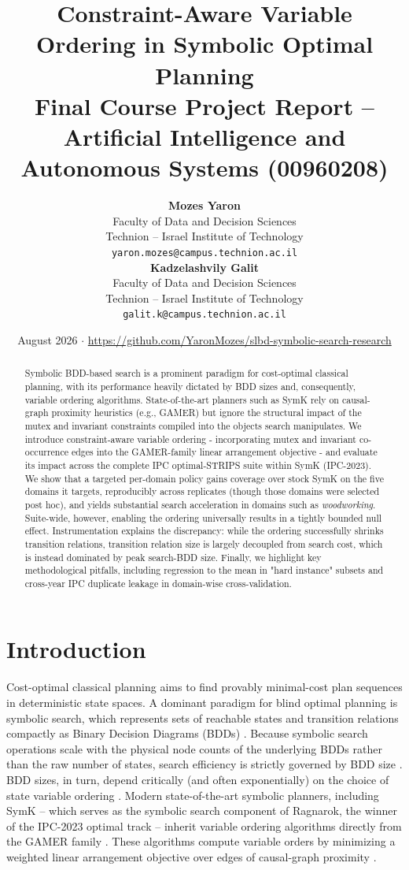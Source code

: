 \documentclass[twocolumn,10pt]{article}
\title{\textbf{\Large Constraint-Aware Variable Ordering in Symbolic Optimal Planning}\\[0.5em]
\large \textcolor{accent}{Final Course Project Report -- Artificial Intelligence and Autonomous Systems (00960208)}}
\author{
  \begin{minipage}[t]{0.45\textwidth}
    \centering
    \textbf{Mozes Yaron}\\[0.4em]
    \small Faculty of Data and Decision Sciences\\
    \small Technion -- Israel Institute of Technology\\
    \small \texttt{yaron.mozes@campus.technion.ac.il}
  \end{minipage}%
  \hfill
  \begin{minipage}[t]{0.45\textwidth}
    \centering
    \textbf{Kadzelashvily Galit}\\[0.4em]
    \small Faculty of Data and Decision Sciences\\
    \small Technion -- Israel Institute of Technology\\
    \small \texttt{galit.k@campus.technion.ac.il}
  \end{minipage}
}
\date{\small August 2026 \quad $\cdot$ \quad \url{https://github.com/YaronMozes/slbd-symbolic-search-research}}
\begin{document}
\maketitle

\begin{abstract}
\noindent Symbolic BDD-based search is a prominent paradigm for cost-optimal classical planning, with its performance heavily dictated by BDD sizes and, consequently, variable ordering algorithms. State-of-the-art planners such as \textsf{SymK} rely on causal-graph proximity heuristics (e.g., \textsf{GAMER}) but ignore the structural impact of the mutex and invariant constraints compiled into the objects search manipulates. We introduce constraint-aware variable ordering - incorporating mutex and invariant co-occurrence edges into the \textsf{GAMER}-family linear arrangement objective - and evaluate its impact across the complete IPC optimal-STRIPS suite within \textsf{SymK} (IPC-2023). We show that a targeted per-domain policy gains coverage over stock \textsf{SymK} on the five domains it targets, reproducibly across replicates (though those domains were selected post hoc), and yields substantial search acceleration in domains such as \textit{woodworking}. Suite-wide, however, enabling the ordering universally results in a tightly bounded null effect. Instrumentation explains the discrepancy: while the ordering successfully shrinks transition relations, transition relation size is largely decoupled from search cost, which is instead dominated by peak search-BDD size. Finally, we highlight key methodological pitfalls, including regression to the mean in "hard instance" subsets and cross-year IPC duplicate leakage in domain-wise cross-validation.
\end{abstract}

\section{Introduction}
Cost-optimal classical planning aims to find provably minimal-cost plan sequences in deterministic state spaces. A dominant paradigm for blind optimal planning is symbolic search, which represents sets of reachable states and transition relations compactly as Binary Decision Diagrams (BDDs) \cite{torralba2014symba}. Because symbolic search operations scale with the physical node counts of the underlying BDDs rather than the raw number of states, search efficiency is strictly governed by BDD size \cite{kissmann2014bdd}. BDD sizes, in turn, depend critically (and often exponentially) on the choice of state variable ordering \cite{kissmann2014bdd}. Modern state-of-the-art symbolic planners, including \textsf{SymK} \cite{speck2020symk, speck2023symkipc} -- which serves as the symbolic search component of \textsf{Ragnarok}, the winner of the IPC-2023 optimal track \cite{drexler2023ragnarok, taitler2024ipc} -- inherit variable ordering algorithms directly from the \textsf{GAMER} family \cite{edelkamp2008gamer}. These algorithms compute variable orders by minimizing a weighted linear arrangement objective over edges of causal-graph proximity \cite{edelkamp2008gamer}.
\end{document}
